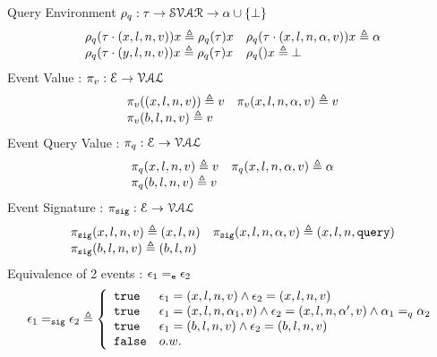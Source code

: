 %
Query Environment $\rho_{q}: \mathtt{\tau} \to \mathcal{SVAR} \to \alpha \cup \{\bot\}$
\[
\begin{array}{ll}
\rho_{q}(\mathtt{\tau} \cdot (x, l, n, v)) x \triangleq \rho_{q}(\mathtt{\tau}) x
&
\rho_{q}(\mathtt{\tau} \cdot (x, l, n, \alpha, v)) x \triangleq \alpha
\\
\rho_{q}(\mathtt{\tau} \cdot (y, l, n, v)) x \triangleq \rho_{q}(\mathtt{\tau}) x
&
\rho_{q}() x \triangleq \bot
\end{array}
\]
%
Event Value : $\pi_v : \mathcal{E} \to \mathcal{VAL}$
\[
\begin{array}{ll}
\pi_v((x, l, n, v)) \triangleq v
&
\pi_v (x, l, n, \alpha, v) \triangleq v
\\
\pi_v (b, l, n, v)  \triangleq v
&
\end{array}
\]
%
Event Query Value : $\pi_{q} : \mathcal{E} \to \mathcal{VAL}$
\[
\begin{array}{ll}
\pi_{q} (x, l, n, v) \triangleq v
&
\pi_{q} (x, l, n, \alpha, v) \triangleq \alpha
\\
\pi_{q} (b, l, n, v)  \triangleq v
&
\end{array}
\]%
% 
Event Signature : $\pi_{\mathtt{sig}} : \mathcal{E} \to \mathcal{VAL}$
\[
\begin{array}{ll}
\pi_{\mathtt{sig}} (x, l, n, v) \triangleq (x, l, n)
&
\pi_{\mathtt{sig}} (x, l, n, \alpha, v) \triangleq (x, l, n, {\tt query})
\\
\pi_{\mathtt{sig}} (b, l, n, v)  \triangleq (b, l, n)
&
\end{array}
\]
%
Equivalence of 2 events : $\mathtt{\epsilon}_1 =_{\mathtt{e}} \mathtt{\epsilon}_2$
\[
\event_1 \sigeq \event_2 \triangleq
\left\{
\begin{array}{ll}
\etrue & \event_1 = (x, l, n, v) \land \event_2 = (x, l, n, v) \\
\etrue & \event_1 = (x, l, n, \qval_1, v) \land \event_2 = (x, l, n, \qval', v)  
\land \qval_1 =_{q} \qval_2\\
\etrue & \event_1 = (b, l, n, v) \land \event_2 = (b, l, n, v) \\
\efalse & o.w.
\end{array}
\right.
\]

